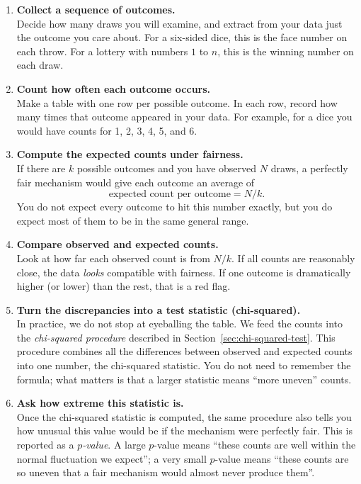 \begin{enumerate}
  \item \textbf{Collect a sequence of outcomes.}\\
        Decide how many draws you will examine, and extract from your data just the outcome you care about.  For a six-sided dice, this is the face number on each throw.  For a lottery with numbers \(1\) to \(n\), this is the winning number on each draw.

  \item \textbf{Count how often each outcome occurs.}\\
        Make a table with one row per possible outcome.  In each row, record how many times that outcome appeared in your data.  For example, for a dice you would have counts for 1, 2, 3, 4, 5, and 6.

  \item \textbf{Compute the expected counts under fairness.}\\
        If there are \(k\) possible outcomes and you have observed \(N\) draws, a perfectly fair mechanism would give each outcome an average of
        \[
          \text{expected count per outcome} = N / k.
        \]
        You do not expect every outcome to hit this number exactly, but you do expect most of them to be in the same general range.

  \item \textbf{Compare observed and expected counts.}\\
        Look at how far each observed count is from \(N/k\).  If all counts are reasonably close, the data \emph{looks} compatible with fairness.  If one outcome is dramatically higher (or lower) than the rest, that is a red flag.

  \item \textbf{Turn the discrepancies into a test statistic (chi-squared).}\\
        In practice, we do not stop at eyeballing the table.  We feed the counts into the \emph{chi-squared procedure} described in Section~\ref{sec:chi-squared-test}.  This procedure combines all the differences between observed and expected counts into one number, the chi-squared statistic.  You do not need to remember the formula; what matters is that a larger statistic means ``more uneven'' counts.

  \item \textbf{Ask how extreme this statistic is.}\\
        Once the chi-squared statistic is computed, the same procedure also tells you how unusual this value would be if the mechanism were perfectly fair.  This is reported as a \emph{$p$-value}.  A large $p$-value means ``these counts are well within the normal fluctuation we expect''; a very small $p$-value means ``these counts are so uneven that a fair mechanism would almost never produce them''.


\end{enumerate}
